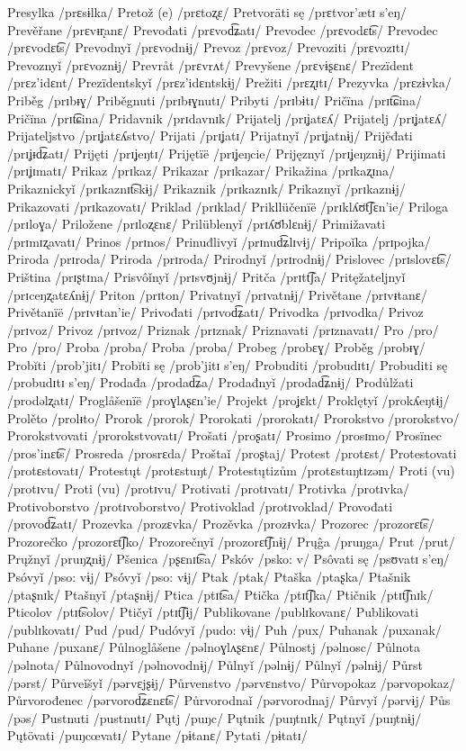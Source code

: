 Presylka /prɛsɨlka/
Pretož (e) /prɛtoʐɛ/
Pretvoräti sę /prɛtvor’ætɪ s’eŋ/
Prevěřane /prɛvᵻr̝anɛ/
Prevođati /prɛvod͡ʑatɪ/
Prevodec /prɛvodɛt͡s/
Prevodec /prɛvodɛt͡s/
Prevodnyǐ /prɛvodnɨj/
Prevoz /prɛvoz/
Prevoziti /prɛvozɪtɪ/
Prevoznyǐ /prɛvoznɨj/
Prevråt /prɛvrʌt/
Prevyšene /prɛvɨʂɛnɛ/
Prezïdent /prɛz’idɛnt/
Prezïdentskyǐ /prɛz’idɛntskɨj/
Prežiti /prɛʐɪtɪ/
Prezyvka /prɛzɨvka/
Priběg /prɪbᵻɣ/
Priběgnuti /prɪbᵻɣnutɪ/
Pribyti /prɪbɨtɪ/
Pričïna /prɪt͡ɕina/
Pričïna /prɪt͡ɕina/
Pridavnik /prɪdavnɪk/
Prijatelj /prɪʝatɛʎ/
Prijatelj /prɪʝatɛʎ/
Prijateljstvo /prɪʝatɛʎstvo/
Prijati /prɪʝatɪ/
Prijatnyǐ /prɪʝatnɨj/
Prijěđati /prɪʝᵻd͡ʑatɪ/
Prijęti /prɪʝeŋtɪ/
Prijętïë /prɪʝeŋcie/
Prijęznyǐ /prɪʝeŋznɨj/
Prijimati /prɪʝɪmatɪ/
Prikaz /prɪkaz/
Prikazar /prɪkazar/
Prikažina /prɪkaʐɪna/
Prikaznickyǐ /prɪkaznɪt͡skɨj/
Prikaznik /prɪkaznɪk/
Prikaznyǐ /prɪkaznɨj/
Prikazovati /prɪkazovatɪ/
Priklad /prɪklad/
Prikllüčenïë /prɪklʎʊ̈t͡ʃɛn’ie/
Priloga /prɪloɣa/
Priložene /prɪloʐɛnɛ/
Prilüblenyǐ /prɪʎʊ̈blɛnɨj/
Primižavati /prɪmɪʐavatɪ/
Prinos /prɪnos/
Prinuđlivyǐ /prɪnud͡ʑlɪvɨj/
Pripoǐka /prɪpojka/
Priroda /prɪroda/
Priroda /prɪroda/
Prirodnyǐ /prɪrodnɨj/
Prislovec /prɪslovɛt͡s/
Priština /prɪʂtɪna/
Prisvôǐnyǐ /prɪsvʊjnɨj/
Pritča /prɪtt͡ʃa/
Pritęžateljnyǐ /prɪceŋʐatɛʎnɨj/
Priton /prɪton/
Privatnyǐ /prɪvatnɨj/
Privětane /prɪvᵻtanɛ/
Privětanïë /prɪvᵻtan’ie/
Privođati /prɪvod͡ʑatɪ/
Privodka /prɪvodka/
Privoz /prɪvoz/
Privoz /prɪvoz/
Priznak /prɪznak/
Priznavati /prɪznavatɪ/
Pro /pro/
Pro /pro/
Proba /proba/
Proba /proba/
Probeg /probɛɣ/
Proběg /probᵻɣ/
Probĭti /prob’jitɪ/
Probĭti sę /prob’jitɪ s’eŋ/
Probuditi /probudɪtɪ/
Probuditi sę /probudɪtɪ s’eŋ/
Prodađa /prodad͡ʑa/
Prodađnyǐ /prodad͡ʑnɨj/
Prodůlžati /prodəlʐatɪ/
Proglåšenïë /proɣlʌʂɛn’ie/
Projekt /proʝɛkt/
Proklętyǐ /prokʎeŋtɨj/
Prolěto /prolᵻto/
Prorok /prorok/
Prorokati /prorokatɪ/
Prorokstvo /prorokstvo/
Prorokstvovati /prorokstvovatɪ/
Prošati /proʂatɪ/
Prosimo /prosɪmo/
Prosïnec /pros’inɛt͡s/
Prosreda /prosrɛda/
Proštaǐ /proʂtaj/
Protest /protɛst/
Protestovati /protɛstovatɪ/
Protestųt /protɛstuŋt/
Protestųtizům /protɛstuŋtɪzəm/
Proti (vu) /protɪvu/
Proti (vu) /protɪvu/
Protivati /protɪvatɪ/
Protivka /protɪvka/
Protivoborstvo /protɪvoborstvo/
Protivoklad /protɪvoklad/
Provođati /provod͡ʑatɪ/
Prozevka /prozɛvka/
Prozěvka /prozᵻvka/
Prozorec /prozorɛt͡s/
Prozorečko /prozorɛt͡ʃko/
Prozorečnyǐ /prozorɛt͡ʃnɨj/
Prųĝa /pruŋga/
Prut /prut/
Prųžnyǐ /pruŋʐnɨj/
Pšenica /pʂɛnɪt͡sa/
Pskóv /psko: v/
Psôvati sę /psʊvatɪ s’eŋ/
Psóvyǐ /pso: vɨj/
Psóvyǐ /pso: vɨj/
Ptak /ptak/
Ptaška /ptaʂka/
Ptašnik /ptaʂnɪk/
Ptašnyǐ /ptaʂnɨj/
Ptica /ptɪt͡sa/
Ptička /ptɪt͡ʃka/
Ptičnik /ptɪt͡ʃnɪk/
Pticolov /ptɪt͡solov/
Ptičyǐ /ptɪt͡ʃɨj/
Publikovane /publɪkovanɛ/
Publikovati /publɪkovatɪ/
Pud /pud/
Pudóvyǐ /pudo: vɨj/
Puh /pux/
Puhanak /puxanak/
Puhane /puxanɛ/
Půlnoglåšene /pəlnoɣlʌʂɛnɛ/
Půlnostj /pəlnosc/
Půlnota /pəlnota/
Půlnovodnyǐ /pəlnovodnɨj/
Půlnyǐ /pəlnɨj/
Půlnyǐ /pəlnɨj/
Půrst /pərst/
Půrveǐšyǐ /pərvɛjʂɨj/
Půrvenstvo /pərvɛnstvo/
Půrvopokaz /pərvopokaz/
Půrvorođenec /pərvorod͡ʑɛnɛt͡s/
Půrvorodnaǐ /pərvorodnaj/
Půrvyǐ /pərvɨj/
Půs /pəs/
Pustnuti /pustnutɪ/
Pųtj /puŋc/
Pųtnik /puŋtnɪk/
Pųtnyǐ /puŋtnɨj/
Pųtövati /puŋcœvatɪ/
Pytane /pɨtanɛ/
Pytati /pɨtatɪ/